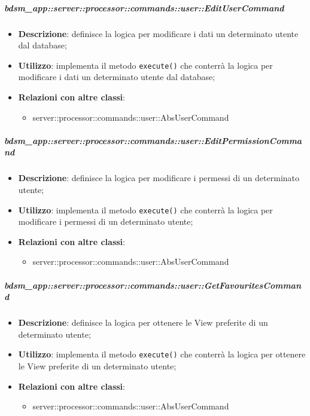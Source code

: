         \subparagraph{bdsm\_app::server::processor::commands::user::EditUserCommand} %
        \label{subp:bdsm_app_server_processor_commands_user_editusercommand}
        \begin{itemize}
          \item \textbf{Descrizione}: definisce la logica per modificare i dati un determinato utente dal database;
          \item \textbf{Utilizzo}: implementa il metodo \texttt{execute()} che conterrà la logica per modificare i dati un determinato utente dal database;
          \item \textbf{Relazioni con altre classi}:
            \begin{itemize}
              \item server::processor::commands::user::AbsUserCommand
            \end{itemize}
        \end{itemize}

        \subparagraph{bdsm\_app::server::processor::commands::user::EditPermissionCommand} %
        \label{subp:bdsm_app_server_processor_commands_user_editpermissioncommand}
        \begin{itemize}
          \item \textbf{Descrizione}: definisce la logica per modificare i permessi di un determinato utente;
          \item \textbf{Utilizzo}: implementa il metodo \texttt{execute()} che conterrà la logica per modificare i permessi di un determinato utente;
          \item \textbf{Relazioni con altre classi}:
            \begin{itemize}
              \item server::processor::commands::user::AbsUserCommand
            \end{itemize}
        \end{itemize}

        \subparagraph{bdsm\_app::server::processor::commands::user::GetFavouritesCommand} %
        \label{subp:bdsm_app_server_processor_commands_user_getfavouritescommand}
        \begin{itemize}
          \item \textbf{Descrizione}: definisce la logica per ottenere le View preferite di un determinato utente;
          \item \textbf{Utilizzo}: implementa il metodo \texttt{execute()} che conterrà la logica per ottenere le View preferite di un determinato utente;
          \item \textbf{Relazioni con altre classi}:
            \begin{itemize}
              \item server::processor::commands::user::AbsUserCommand
            \end{itemize}
        \end{itemize}

